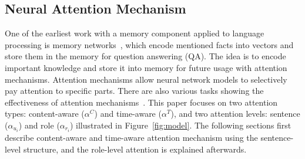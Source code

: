 \documentclass{article}
\begin{document}
\subsection{Neural Attention Mechanism}
One of the earliest work with a memory component applied to language processing is memory networks~\cite{weston2015memory,sukhbaatar2015end}, which encode mentioned facts into vectors and store them in the memory for question answering (QA).
The idea is to encode important knowledge and store it into memory for future usage with attention mechanisms.
Attention mechanisms allow neural network models to selectively pay attention to specific parts.
There are also various tasks showing the effectiveness of attention mechanisms~\cite{xiong2016dynamic,chen2016end}. 
This paper focuses on two attention types: content-aware ($\alpha^C$) and time-aware ($\alpha^T$), and two attention levels: sentence ($\alpha_{u_i}$) and role ($\alpha_{r_i}$) illustrated in Figure~\ref{fig:model}.
The following sections first describe content-aware and time-aware attention mechanism using the sentence-level structure, and the role-level attention is explained afterwards.
\end{document}
